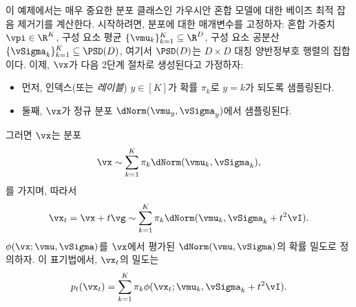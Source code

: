 \documentclass[../../book-main_ko.tex]{subfiles}
\begin{document}
\begin{example}\label{example:denoising_gaussian_mixture}
	이 예제에서는 매우 중요한 분포 클래스인 가우시안 혼합 모델에 대한 베이즈 최적 잡음 제거기를 계산한다. 시작하려면, 분포에 대한 매개변수를 고정하자: 혼합 가중치 \(\vpi \in \R^{K}\), 구성 요소 평균 \(\{\vmu_{k}\}_{k = 1}^{K} \subseteq \R^{D}\), 구성 요소 공분산 \(\{\vSigma_{k}\}_{k = 1}^{K} \subseteq \PSD(D)\), 여기서 \(\PSD(D)\)는 \(D \times D\) 대칭 양반정부호 행렬의 집합이다. 이제, \(\vx\)가 다음 2단계 절차로 생성된다고 가정하자:
	\begin{itemize}
		\item 먼저, 인덱스(또는 \textit{레이블}) \(y \in [K]\)가 확률 \(\pi_{k}\)로 \(y = k\)가 되도록 샘플링된다.
		\item 둘째, \(\vx\)가 정규 분포 \(\dNorm(\vmu_{y}, \vSigma_{y})\)에서 샘플링된다.
	\end{itemize}
	그러면 \(\vx\)는 분포
	\begin{equation}
		\vx \sim \sum_{k = 1}^{K}\pi_{k}\dNorm(\vmu_{k}, \vSigma_{k}),
	\end{equation}
	를 가지며, 따라서
	\begin{equation}
		\vx_{t} = \vx + t\vg \sim \sum_{k = 1}^{K}\pi_{k}\dNorm(\vmu_{k}, \vSigma_{k} + t^{2}\vI).
	\end{equation}
	\(\phi(\vx ; \vmu, \vSigma)\)를 \(\vx\)에서 평가된 \(\dNorm(\vmu, \vSigma)\)의 확률 밀도로 정의하자. 이 표기법에서, \(\vx_{t}\)의 밀도는
	\begin{equation}
		p_{t}(\vx_{t}) = \sum_{k = 1}^{K}\pi_{k}\phi(\vx_{t} ; \vmu_{k}, \vSigma_{k} + t^{2}\vI).
	\end{equation}


\end{example}
\end{document}

